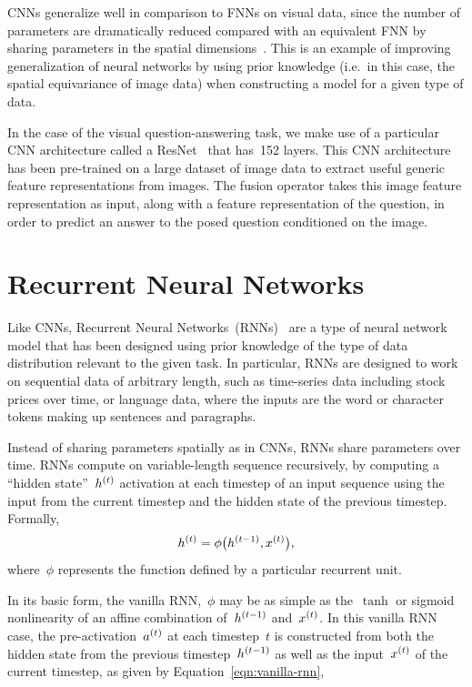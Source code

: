 CNNs generalize well in comparison to FNNs on visual data, since the number of
parameters are dramatically reduced compared with an equivalent FNN by sharing
parameters in the spatial dimensions~\cite{lecun-89}. This is an example of
improving generalization of neural networks by using prior knowledge (i.e.\ in
this case, the spatial equivariance of image data) when constructing a model
for a given type of data.

In the case of the visual question-answering task, we make use of a particular
CNN architecture called a ResNet~\cite{he2016deep} that has~\num{152} layers.
This CNN architecture has been pre-trained on a large dataset of image data to
extract useful generic feature representations from images.
The fusion operator takes this image feature representation as input, along
with a feature representation of the question, in order to predict an answer to
the posed question conditioned on the image.


\section{Recurrent Neural Networks}

Like CNNs, Recurrent Neural Networks~(RNNs)~\cite{rumelhart1986learning} are a
type of neural network model that has been designed using prior knowledge of
the type of data distribution relevant to the given task.
In particular, RNNs are designed to work on sequential data of arbitrary
length, such as time-series data including stock prices over time, or language
data, where the inputs are the word or character tokens making up sentences and
paragraphs.

Instead of sharing parameters spatially as in CNNs, RNNs share parameters over
time.
RNNs compute on variable-length sequence recursively, by computing a ``hidden
state''~$h^{(t)}$ activation at each timestep of an input sequence using
the input from the current timestep and the hidden state of the previous
timestep.
Formally,
\begin{equation}
h^{(t)} = \phi\big(h^{(t - 1)}, x^{(t)}\big),
\label{eqn:highlevel-rnn}
\end{equation}
where~$\phi$ represents the function defined by a particular recurrent unit.

In its basic form, the vanilla RNN,~$\phi$ may be as simple as the~$\tanh$ or
sigmoid nonlinearity of an affine combination of~$h^{(t - 1)}$
and~$x^{(t)}$.
In this vanilla RNN case, the pre-activation~$a^{(t)}$ at each timestep~$t$
is constructed from both the hidden state from the previous
timestep~$h^{(t - 1)}$ as well as the input~$x^{(t)}$ of the current
timestep, as given by Equation~\ref{eqn:vanilla-rnn},

